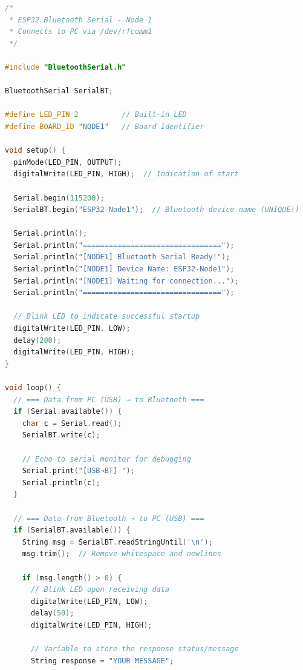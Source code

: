 
\label{app:A}

\setcounter{section}{0}
%
\begingroup
\def\addcontentsline#1#2#3{}%

\endgroup

\label{app:B}
\renewcommand{\thelstlisting}{Б\arabic{lstlisting}}
\setcounter{lstlisting}{0}

\begin{lstlisting}[language=C++, caption={Прошивка SPP\_NODE\_1.ino}, label={lst:SPP_node_1.ino}]
/*
 * ESP32 Bluetooth Serial - Node 1
 * Connects to PC via /dev/rfcomm1
 */

#include "BluetoothSerial.h"

BluetoothSerial SerialBT;

#define LED_PIN 2          // Built-in LED
#define BOARD_ID "NODE1"   // Board Identifier

void setup() {
  pinMode(LED_PIN, OUTPUT);
  digitalWrite(LED_PIN, HIGH);  // Indication of start
  
  Serial.begin(115200);
  SerialBT.begin("ESP32-Node1");  // Bluetooth device name (UNIQUE!)
  
  Serial.println();
  Serial.println("================================"); 
  Serial.println("[NODE1] Bluetooth Serial Ready!");
  Serial.println("[NODE1] Device Name: ESP32-Node1");
  Serial.println("[NODE1] Waiting for connection...");
  Serial.println("================================");
  
  // Blink LED to indicate successful startup
  digitalWrite(LED_PIN, LOW);
  delay(200);
  digitalWrite(LED_PIN, HIGH);
}

void loop() {
  // === Data from PC (USB) → to Bluetooth ===
  if (Serial.available()) {
    char c = Serial.read();
    SerialBT.write(c);
    
    // Echo to serial monitor for debugging
    Serial.print("[USB→BT] ");
    Serial.println(c);
  }
  
  // === Data from Bluetooth → to PC (USB) ===
  if (SerialBT.available()) {
    String msg = SerialBT.readStringUntil('\n');
    msg.trim();  // Remove whitespace and newlines
    
    if (msg.length() > 0) {
      // Blink LED upon receiving data
      digitalWrite(LED_PIN, LOW);
      delay(50);
      digitalWrite(LED_PIN, HIGH);
      
      // Variable to store the response status/message
      String response = "YOUR MESSAGE";
      

\end{lstlisting}
